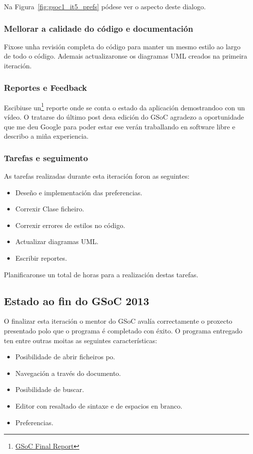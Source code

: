 Na Figura~\ref{fig:gsoc1_it5_prefs} pódese ver o aspecto deste dialogo.

\subsubsection{Mellorar a calidade do código e documentación}
Fixose unha revisión completa do código para manter un mesmo estilo ao largo de todo o código. Ademais actualizaronse os diagramas UML creados na primeira iteración.

\subsubsection{Reportes e Feedback}
Escibiuse un\footnote{\href{http://aquelando.info/gsoc-final-report/}{GSoC Final Report}} reporte onde se conta o estado da aplicación demostrandoo con un vídeo. O tratarse do último post desa edición do GSoC agradezo a oportunidade que me deu Google para poder estar ese verán traballando en software libre e describo a miña experiencia.

\subsubsection{Tarefas e seguimento}

As tarefas realizadas durante esta iteración foron as seguintes:

\begin {itemize}
  \item Deseño e implementación das preferencias.
  \item Correxir Clase ficheiro.
  \item Correxir errores de estilos no código.
  \item Actualizar diagramas UML.
  \item Escribir reportes.
\end {itemize}

Planificaronse un total de  horas para a realización destas tarefas.

\subsection{Estado ao fin do GSoC 2013}
O finalizar esta iteración o mentor do GSoC avalía correctamente o proxecto presentado polo que o programa é completado con éxito. O programa entregado ten entre outras moitas as seguintes características:

\begin{itemize}
  \item Posibilidade de abrir ficheiros po.
  \item Navegación a través do documento.
  \item Posibilidade de buscar.
  \item Editor con resaltado de sintaxe e de espacios en branco.
  \item Preferencias.
\end{itemize}

